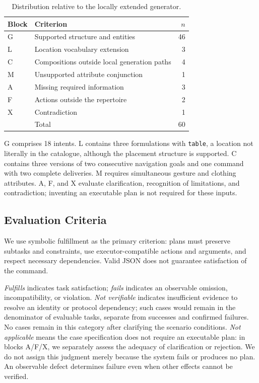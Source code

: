 \documentclass[a4paper,twoside]{article}
\begin{document}
\begin{table}[htbp]
\centering\small
\caption{Distribution relative to the locally extended generator.}
\label{tab:bloques_piloto}
\begin{tabularx}{\columnwidth}{@{}l>{\raggedright\arraybackslash}Xr@{}}
\toprule
Block & Criterion & $n$ \\
\midrule
G & Supported structure and entities & 46 \\
L & Location vocabulary extension & 3 \\
C & Compositions outside local generation paths & 4 \\
M & Unsupported attribute conjunction & 1 \\
A & Missing required information & 3 \\
F & Actions outside the repertoire & 2 \\
X & Contradiction & 1 \\
\midrule
 & Total & 60 \\
\bottomrule
\end{tabularx}
\end{table}

G comprises 18 intents. L contains three formulations with \texttt{table}, a location not literally in the catalogue, although the placement structure is supported. C contains three versions of two consecutive navigation goals and one command with two complete deliveries. M requires simultaneous gesture and clothing attributes. A, F, and X evaluate clarification, recognition of limitations, and contradiction; inventing an executable plan is not required for these inputs.

\subsection{Evaluation Criteria}
We use symbolic fulfillment as the primary criterion: plans must preserve subtasks and constraints, use executor-compatible actions and arguments, and respect necessary dependencies. Valid JSON does not guarantee satisfaction of the command.

\emph{Fulfills} indicates task satisfaction; \emph{fails} indicates an observable omission, incompatibility, or violation. \emph{Not verifiable} indicates insufficient evidence to resolve an identity or protocol dependency; such cases would remain in the denominator of evaluable tasks, separate from successes and confirmed failures. No cases remain in this category after clarifying the scenario conditions. \emph{Not applicable} means the case specification does not require an executable plan: in blocks A/F/X, we separately assess the adequacy of clarification or rejection. We do not assign this judgment merely because the system fails or produces no plan. An observable defect determines failure even when other effects cannot be verified.
\end{document}
